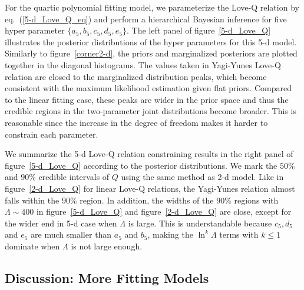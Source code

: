 \documentclass[a4paper,11pt]{article}
\begin{document}
For the quartic polynomial fitting model, we parameterize the Love-Q relation by eq.~(\ref{5-d_Love_Q_eq}) and perform a hierarchical Bayesian inference 
for five hyper parameter $\{a_5, b_5, c_5, d_5, e_5\}$. The left panel of figure~\ref{5-d_Love_Q} illustrates the posterior distributions of the hyper parameters for this 5-d model. 
Similarly to figure~\ref{corner2-d}, the priors and marginalized posteriors are plotted together in the diagonal histograms. 
The values taken in Yagi-Yunes Love-Q relation are closed to the marginalized distribution peaks, which become consistent with the maximum likelihood estimation given flat priors. 
Compared to the linear fitting case, these peaks are wider in the prior space and thus the credible regions in the two-parameter joint distributions become broader. 
This is reasonable since the increase in the degree of freedom makes it harder to constrain each parameter.

We summarize the 5-d Love-Q relation constraining results in the right panel of figure~\ref{5-d_Love_Q} according to the posterior distributions. We mark the $50\%$ and $90\%$ credible intervals of $Q$ 
using the same method as 2-d model. Like in figure~\ref{2-d_Love_Q} for linear Love-Q relations, the Yagi-Yunes relation almost falls within the $90\%$ region. 
In addition, the widths of the $90\%$ regions with $\Lambda \sim 400$ in figure~\ref{5-d_Love_Q} and figure~\ref{2-d_Love_Q} are close, except for the wider end in 5-d case when $\Lambda$ is large. 
This is understandable because $c_5, d_5$ and $e_5$ are much smaller than $a_5$ and $b_5$, making the $\ln^k\Lambda$ terms with $k\leq1$ dominate when $\Lambda$ is not large enough.

\subsection{Discussion: More Fitting Models}
\label{sec4_3}
\end{document}
